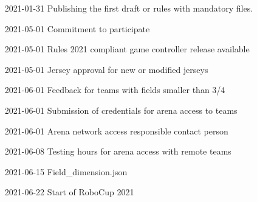 \begin{itemize}[leftmargin=*,labelsep=0.7cm, labelindent=2cm]
    \item [2021-01-31] Publishing the first draft or rules with mandatory files.
    \item [2021-05-01] Commitment to participate
    \item [2021-05-01] Rules 2021 compliant game controller release available
    \item [2021-05-01] Jersey approval for new or modified jerseys
    \item [2021-06-01] Feedback for teams with fields smaller than 3/4
    \item [2021-06-01] Submission of credentials for arena access to teams
    \item [2021-06-01] Arena network access responsible contact person
    \item [2021-06-08] Testing hours for arena access with remote teams
    \item [2021-06-15] Field\_dimension.json
    \item [2021-06-22] Start of RoboCup 2021
\end{itemize}
